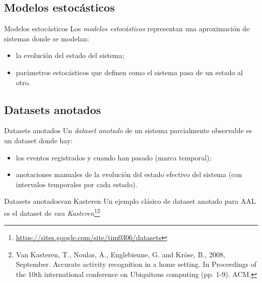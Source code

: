 \documentclass[9pt, handout]{beamer}
\begin{document}
    \subsection{Modelos estocásticos}
      \begin{frame}{Modelos estocásticos}
        \pause
        Los \textit{modelos estocásticos} representan una aproximación de sistemas donde se modelan:
        \pause
        \begin{itemize}
          \item la evolución del estado del sistema;
          \pause
          \item parámetros estocásticos que definen como el sistema pasa de un estado al otro.
        \end{itemize}
        \pause
      \end{frame}
    
    \subsection{Datasets anotados}
      \begin{frame}{Datasets anotados}
        \pause
        Un \textit{dataset anotado} de un sistema parcialmente observable es un dataset donde hay:
        \pause
        \begin{itemize}
          \item los eventos registrados y cuando han pasado (marca temporal);
          \pause
          \item anotaciones manuales de la evolución del estado efectivo del sistema (con intervalos temporales por cada estado).
        \end{itemize}
        
        \pause
        \vspace{1em}
      \end{frame}
      
      \begin{frame}{Datasets anotados}{van Kasteren}
        Un ejemplo clásico de dataset anotado para AAL es el dataset de \textit{van Kasteren}\footnote{\url{https://sites.google.com/site/tim0306/datasets}}\footnote{Van Kasteren, T., Noulas, A., Englebienne, G. and Kröse, B., 2008, September. Accurate activity recognition in a home setting. In Proceedings of the 10th international conference on Ubiquitous computing (pp. 1-9). ACM.}
        
        \pause
      \end{frame}
      
\end{document}
